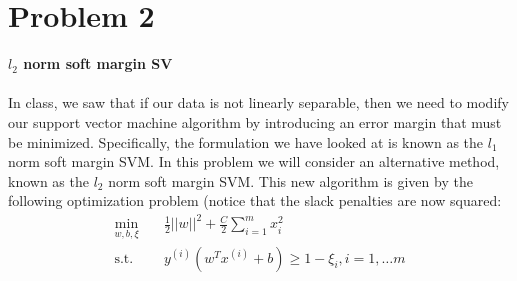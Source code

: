 \documentclass{article}
\begin{document}
\section{Problem 2}
\textbf{$l_2$ norm soft margin SV\\\\}
In class, we saw that if our data is not linearly separable, then we need to modify our
support vector machine algorithm by introducing an error margin that must be minimized.
Specifically, the formulation we have looked at is known as the $l_1$ norm soft margin SVM.
In this problem we will consider an alternative method, known as the $l_2$ norm soft margin
SVM. This new algorithm is given by the following optimization problem (notice that the
slack penalties are now squared:\begin{align*}
    \min_{w,b,\xi} \quad &\frac{1}{2}||w||^2+\frac{C}{2}\sum_{i=1}^{m}x_i^2\\
    \textrm{s.t.} \quad &y^{(i)}(w^Tx^{(i)}+b) \geq 1-\xi_i, i=1,\dots m
\end{align*}
\end{document}
